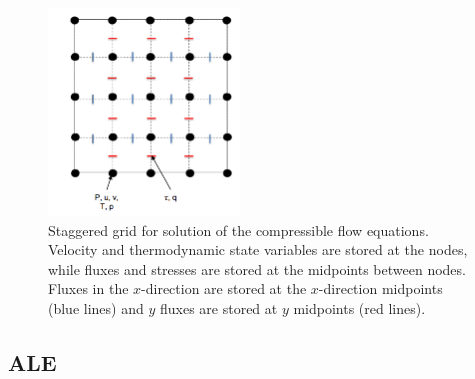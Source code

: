 \documentclass{article}
\begin{document}
\begin{figure}
\centering
\includegraphics[width=2in]{grid}
\caption{\label{fig:grid} Staggered grid for solution of the compressible flow equations. Velocity and thermodynamic state variables are stored at the nodes, while fluxes and stresses are stored at the midpoints between nodes. Fluxes in the $x$-direction are stored at the $x$-direction midpoints (blue lines) and $y$ fluxes are stored at $y$ midpoints (red lines). }
  \end{figure}	
    

\subsection{ALE}
\end{document}
